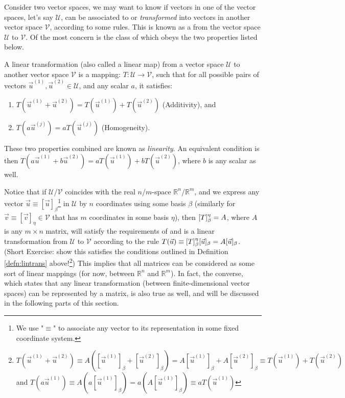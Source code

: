 Consider two vector spaces, we may want to know if vectors in one of the vector spaces, let's say $\mathcal{U}$, can be associated to or \textit{transformed} into vectors in another vector space $\mathcal{V}$, according to some rules. This is known as a  from the vector space $\mathcal{U}$ to $\mathcal{V}$. Of the most concern is the class of  which obeys the two properties listed below.
\begin{defn}
\label{defn:lintrans}
A linear transformation (also called a linear map) from a vector space $\mathcal{U}$ to another vector space $\mathcal{V}$ is a mapping: $T: \mathcal{U} \to \mathcal{V}$, such that for all possible pairs of vectors $\vec{u}^{(1)}, \vec{u}^{(2)} \in \mathcal{U}$, and any scalar $a$, it satisfies:
\begin{enumerate}
    \item $T(\vec{u}^{(1)} + \vec{u}^{(2)}) = T(\vec{u}^{(1)}) + T(\vec{u}^{(2)})$ (Additivity), and
    \item $T(a\vec{u}^{(j)}) = aT(\vec{u}^{(j)})$ (Homogeneity).
\end{enumerate}
These two properties combined are known as \textit{linearity}. An equivalent condition is then $T(a\vec{u}^{(1)} + b\vec{u}^{(2)}) = aT(\vec{u}^{(1)}) + bT(\vec{u}^{(2)})$, where $b$ is any scalar as well.
\end{defn}
Notice that if $\mathcal{U}$/$\mathcal{V}$ coincides with the real $n$/$m$-space $\mathbb{R}^n$/$\mathbb{R}^m$, and we express any vector $\vec{u} \equiv [\vec{u}]_\beta$\footnote{We use "$\equiv$" to associate any vector to its representation in some fixed coordinate system.} in $\mathcal{U}$ by $n$ coordinates using some basis $\mathcal{\beta}$ (similarly for $\vec{v} \equiv [\vec{v}]_{\eta} \in \mathcal{V}$ that has $m$ coordinates in some basis $\mathcal{\eta}$), then $\smash{[T]_\beta^{\eta}} = A$, where $A$ is any $m \times n$ matrix, will satisfy the requirements of and is a linear transformation from $\mathcal{U}$ to $\mathcal{V}$ according to the rule $T(\vec{u}) \equiv \smash{[T]_\beta^{\eta}}[\vec{u}]_\beta = A[\vec{u}]_\beta$. (Short Exercise: show this satisfies the conditions outlined in Definition \ref{defn:lintrans} above!\footnote{$T(\vec{u}^{(1)}+\vec{u}^{(2)}) \equiv A([\vec{u}^{(1)}]_\beta + [\vec{u}^{(2)}]_\beta) = A[\vec{u}^{(1)}]_\beta + A[\vec{u}^{(2)}]_\beta \equiv T(\vec{u}^{(1)})+T(\vec{u}^{(2)})$ and $T(a\vec{u}^{(1)}) \equiv A(a[\vec{u}^{(1)}]_\beta) = a(A[\vec{u}^{(1)}]_\beta) \equiv aT(\vec{u}^{(1)})$}) This implies that all matrices can be considered as some sort of linear mappings (for now, between $\mathbb{R}^n$ and $\mathbb{R}^m$). In fact, the converse, which states that any linear transformation (between finite-dimensional vector spaces) can be represented by a matrix, is also true as well, and will be discussed in the following parts of this section. \par

